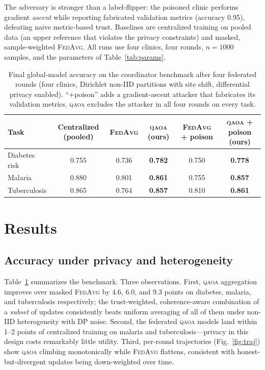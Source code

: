 \documentclass[conference]{IEEEtran}
\newcommand{\qaoa}{\textsc{qaoa}}
\newcommand{\fedavg}{\textsc{FedAvg}}
\begin{document}
The adversary is stronger than a label-flipper: the poisoned clinic performs
gradient \emph{ascent} while reporting fabricated validation metrics
(accuracy 0.95), defeating naive metric-based trust. Baselines are
centralized training on pooled data (an upper reference that violates the
privacy constraints) and masked, sample-weighted \fedavg{}. All runs use four
clinics, four rounds, $n{=}1000$ samples, and the parameters of
Table~\ref{tab:params}.

\begin{table}[t]
\centering
\caption{Final global-model accuracy on the coordinator benchmark after four
federated rounds (four clinics, Dirichlet non-IID partitions with site shift,
differential privacy enabled). ``+poison'' adds a gradient-ascent attacker
that fabricates its validation metrics. \qaoa{} excludes the attacker in all
four rounds on every task.}
\label{tab:main}
\begin{tabular}{lccccc}
\toprule
Task & Centralized (pooled) & \fedavg{} & \qaoa{} (ours) & \fedavg{} + poison & \qaoa{} + poison (ours) \\
\midrule
Diabetes risk & 0.755 & 0.736 & \textbf{0.782} & 0.750 & \textbf{0.778} \\
Malaria       & 0.880 & 0.801 & \textbf{0.861} & 0.755 & \textbf{0.857} \\
Tuberculosis  & 0.865 & 0.764 & \textbf{0.857} & 0.810 & \textbf{0.861} \\
\bottomrule
\end{tabular}
\end{table}

\section{Results}

\subsection{Accuracy under privacy and heterogeneity}
Table~\ref{tab:main} summarizes the benchmark. Three observations.
First, \qaoa{} aggregation improves over masked \fedavg{} by 4.6, 6.0, and
9.3 points on diabetes, malaria, and tuberculosis respectively; the
trust-weighted, coherence-aware combination of a \emph{subset} of updates
consistently beats uniform averaging of all of them under non-IID
heterogeneity with DP noise. Second, the federated \qaoa{} models land within
1--2 points of centralized training on malaria and tuberculosis---privacy in
this design costs remarkably little utility. Third, per-round trajectories
(Fig.~\ref{fig:traj}) show \qaoa{} climbing monotonically while \fedavg{}
flattens, consistent with honest-but-divergent updates being down-weighted
over time.
\end{document}

